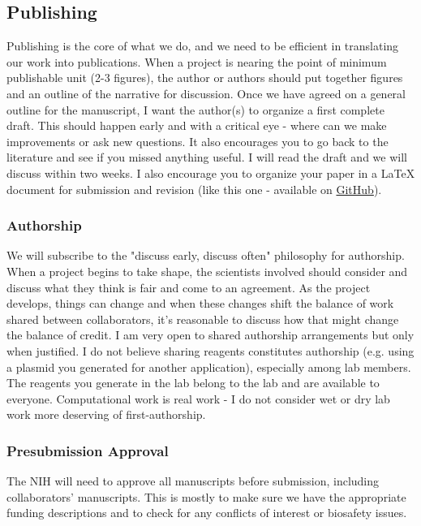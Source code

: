 \documentclass[10pt, letterpaper, twocolumn]{article} %
\begin{document}
\subsection{Publishing}
Publishing is the core of what we do, and we need to be efficient in translating our work into publications. When a project is nearing the point of minimum publishable unit (2-3 figures), the author or authors should put together figures and an outline of the narrative for discussion. Once we have agreed on a general outline for the manuscript, I want the author(s) to organize a first complete draft. This should happen early and with a critical eye - where can we make improvements or ask new questions. It also encourages you to go back to the literature and see if you missed anything useful. I will read the draft and we will discuss within two weeks. I also encourage you to organize your paper in a LaTeX document for submission and revision (like this one - available on \href{https://github.com/QVEU/QVEU/blob/main/ExpectationsDocument/main.tex}{GitHub}).

\subsubsection{Authorship}
We will subscribe to the "discuss early, discuss often" philosophy for authorship. When a project begins to take shape, the scientists involved should consider and discuss what they think is fair and come to an agreement. As the project develops, things can change and when these changes shift the balance of work shared between collaborators, it's reasonable to discuss how that might change the balance of credit. I am very open to shared authorship arrangements but only when justified. I do not believe sharing reagents constitutes authorship (e.g. using a plasmid you generated for another application), especially among lab members. The reagents you generate in the lab belong to the lab and are available to everyone. Computational work is real work - I do not consider wet or dry lab work more deserving of first-authorship.

\subsubsection{Presubmission Approval}
The NIH will need to approve all manuscripts before submission, including collaborators' manuscripts. This is mostly to make sure we have the appropriate funding descriptions and to check for any conflicts of interest or biosafety issues.
\end{document}
